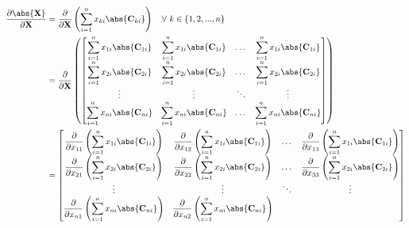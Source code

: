 \begin{align}
    \dfrac{\partial \abs{\mathbf{X}}}{\partial \mathbf{X}} &= \dfrac{\partial}{\partial \mathbf{X}} \left( \sum_{i = 1}^{n} x_{ki} \abs{\mathbf{C}_{ki}} \right) \,\,\,\,\,\, \forall \,\, k \in \left\{ 1, 2, ..., n \right\} \\
    & = \dfrac{\partial}{\partial \mathbf{X}} \left( \begin{bmatrix}
        \displaystyle \sum_{i = 1}^{n} x_{1i} \abs{\mathbf{C}_{1i}} & 
        \displaystyle \sum_{i = 1}^{n} x_{1i} \abs{\mathbf{C}_{1i}} & 
        \dots & 
        \displaystyle \sum_{i = 1}^{n} x_{1i} \abs{\mathbf{C}_{1i}} \\
        \displaystyle \sum_{i = 1}^{n} x_{2i} \abs{\mathbf{C}_{2i}} & 
        \displaystyle \sum_{i = 1}^{n} x_{2i} \abs{\mathbf{C}_{2i}} & 
        \dots & 
        \displaystyle \sum_{i = 1}^{n} x_{2i} \abs{\mathbf{C}_{2i}} \\
        \vdots & \vdots & \ddots & \vdots \\
        \displaystyle \sum_{i = 1}^{n} x_{ni} \abs{\mathbf{C}_{ni}} & 
        \displaystyle \sum_{i = 1}^{n} x_{ni} \abs{\mathbf{C}_{ni}} & 
        \dots & 
        \displaystyle \sum_{i = 1}^{n} x_{ni} \abs{\mathbf{C}_{ni}}
    \end{bmatrix} \right) \\
    & = \begin{bmatrix}
        \displaystyle \dfrac{\partial}{\partial x_{11}} \left( \sum_{i = 1}^{n} x_{1i} \abs{\mathbf{C}_{1i}} \right) & 
        \displaystyle \dfrac{\partial}{\partial x_{12}} \left( \sum_{i = 1}^{n} x_{1i} \abs{\mathbf{C}_{1i}} \right) & 
        \dots & 
        \displaystyle \dfrac{\partial}{\partial x_{13}} \left( \sum_{i = 1}^{n} x_{1i} \abs{\mathbf{C}_{1i}} \right) \\
        \displaystyle \dfrac{\partial}{\partial x_{21}} \left( \sum_{i = 1}^{n} x_{2i} \abs{\mathbf{C}_{2i}} \right) & 
        \displaystyle \dfrac{\partial}{\partial x_{22}} \left( \sum_{i = 1}^{n} x_{2i} \abs{\mathbf{C}_{2i}} \right) & 
        \dots & 
        \displaystyle \dfrac{\partial}{\partial x_{33}} \left( \sum_{i = 1}^{n} x_{2i} \abs{\mathbf{C}_{2i}} \right) \\
        \vdots & \vdots & \ddots & \vdots \\
        \displaystyle \dfrac{\partial}{\partial x_{n1}} \left( \sum_{i = 1}^{n} x_{ni} \abs{\mathbf{C}_{ni}} \right) & 
        \displaystyle \dfrac{\partial}{\partial x_{n2}} \left( \sum_{i = 1}^{n} x_{ni} \abs{\mathbf{C}_{ni}} \right) & 

\end{bmatrix}
\end{align}
